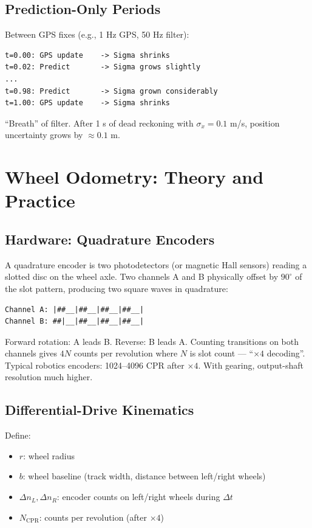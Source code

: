 \documentclass[11pt,a4paper]{article}
\begin{document}
\subsection{Prediction-Only Periods}

Between GPS fixes (e.g., 1 Hz GPS, 50 Hz filter):
\begin{verbatim}
t=0.00: GPS update    -> Sigma shrinks
t=0.02: Predict       -> Sigma grows slightly
...
t=0.98: Predict       -> Sigma grown considerably
t=1.00: GPS update    -> Sigma shrinks
\end{verbatim}
``Breath'' of filter. After 1 s of dead reckoning with $\sigma_{\dot{x}} = 0.1$ m/s, position uncertainty grows by $\approx 0.1$ m.

\section{Wheel Odometry: Theory and Practice}

\subsection{Hardware: Quadrature Encoders}

A quadrature encoder is two photodetectors (or magnetic Hall sensors) reading a slotted disc on the wheel axle. Two channels A and B physically offset by $90^\circ$ of the slot pattern, producing two square waves in quadrature:

\begin{verbatim}
Channel A: |##__|##__|##__|##__|
Channel B: ##|__|##__|##__|##__|
\end{verbatim}

Forward rotation: A leads B. Reverse: B leads A. Counting transitions on both channels gives $4N$ counts per revolution where $N$ is slot count --- ``$\times 4$ decoding''. Typical robotics encoders: 1024--4096 CPR after $\times 4$. With gearing, output-shaft resolution much higher.

\subsection{Differential-Drive Kinematics}

Define:
\begin{itemize}
\item $r$: wheel radius
\item $b$: wheel baseline (track width, distance between left/right wheels)
\item $\Delta n_L, \Delta n_R$: encoder counts on left/right wheels during $\Delta t$
\item $N_{\text{CPR}}$: counts per revolution (after $\times 4$)
\end{itemize}
\end{document}
